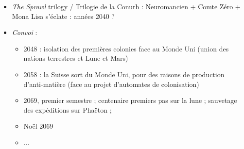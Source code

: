 \documentclass[11pt,twoside,a4paper]{article}
\begin{document}
\begin{multicols*}{2}
\begin{itemize}
	\item \emph{The Sprawl} trilogy / Trilogie de la Conurb : Neuromancien + Comte Z{\'e}ro + Mona Lisa s'{\'e}clate : ann{\'e}es 2040 ?

	\item \emph{Convoi\texttrademark} :
	\begin{itemize}
		\item 2048 : isolation des premi{\`e}res colonies face au Monde Uni (union des nations terrestres et Lune et Mars)
		\item 2058 : la Suisse sort du Monde Uni, pour des raisons de production d'anti-mati{\`e}re (face au projet d'automates de colonisation)
		\item 2069, premier semestre ; centenaire premiers pas sur la lune ; sauvetage des exp{\'e}ditions sur Pha{\"e}ton ; 
		\item No{\"e}l 2069
		\item ...
	\end{itemize}


\end{itemize}
\end{multicols*}
\end{document}
